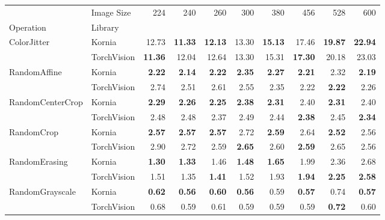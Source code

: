 \begin{table}[!ht]
\centering
\small
\begin{tabular}{llrrrrrrrr}

\toprule
     &     Image Size        &     224 &     240 &     260 &     300 &     380 &     456 &     528 &     600 \\
\cmidrule{1-2}
Operation & Library &        &        &        &        &        &        &        &        \\
\midrule
ColorJitter & Kornia &  12.73 &  \bfseries11.33 &  \bfseries12.13 &  13.30 &  \bfseries15.13 &  17.46 &  \bfseries19.87 &  \bfseries22.94 \\
                   & TorchVision &  \bfseries11.36 &  12.04 &  12.64 &  13.30 &  15.31 &  \bfseries17.30 &  20.18 &  23.03 \\
\midrule
RandomAffine & Kornia &   \bfseries2.22 &   \bfseries2.14 &   \bfseries2.22 &   \bfseries2.35 &   \bfseries2.27 &   \bfseries2.21 &   2.32 &   \bfseries2.19 \\
                   & TorchVision &   2.74 &   2.51 &   2.61 &   2.55 &   2.35 &   2.22 &   \bfseries2.22 &   2.26 \\
\midrule
RandomCenterCrop & Kornia &   \bfseries2.29 &  \bfseries 2.26 &   \bfseries2.25 &   \bfseries2.38 &   \bfseries2.31 &   2.40 &   \bfseries2.31 &   2.40 \\
                   & TorchVision &   2.48 &   2.48 &   2.37 &   2.49 &   2.44 &   \bfseries2.38 &   2.45 &   \bfseries2.34 \\
\midrule
RandomCrop & Kornia &   \bfseries2.57 &   \bfseries2.57 &   \bfseries2.57 &   2.72 &   \bfseries2.59 &   2.64 &   \bfseries2.52 &   2.56 \\
                   & TorchVision &   2.90 &   2.72 &   2.59 &   \bfseries2.65 &   2.60 &   \bfseries2.59 &   2.65 &   2.56 \\
\midrule
RandomErasing & Kornia &   \bfseries1.30 &   \bfseries1.33 &   1.46 &   \bfseries1.48 &  \bfseries 1.65 &   1.99 &   2.36 &   2.68 \\
                   & TorchVision &   1.51 &   1.35 &   \bfseries1.41 &   1.52 &   1.93 &   \bfseries1.94 &   \bfseries2.25 &   \bfseries2.58 \\
\midrule
RandomGrayscale & Kornia &   \bfseries0.62 &   \bfseries0.56 &   \bfseries0.60 &   \bfseries0.56 &   0.59 &   \bfseries0.57 &   0.74 &   \bfseries0.57 \\
                   & TorchVision &   0.68 &   0.59 &   0.61 &   0.59 &   0.59 &   0.59 &   \bfseries0.72 &   0.60 \\

\end{tabular}
\end{table}
